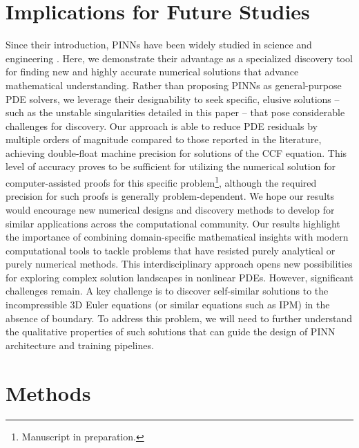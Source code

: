 \documentclass[fleqn,11pt]{wlscirep}
\begin{document}
\section*{Implications for Future Studies}

Since their introduction\cite{Raissi-Perdikaris-Karniadakis:pinn-first-paper}, PINNs have been widely studied in science and engineering \cite{Karniadakis-Kevrekidis-Lu-Perdikaris-Wang-Yang:pinn-nature-reviews}. Here, we demonstrate their advantage as a specialized discovery tool for finding new and highly accurate numerical solutions that advance mathematical understanding. Rather than proposing PINNs as general-purpose PDE solvers, we leverage their designability to seek specific, elusive solutions -- such as the unstable singularities detailed in this paper -- that pose considerable challenges for discovery. Our approach is able to reduce PDE residuals by multiple orders of magnitude compared to those reported in the literature, achieving double-float machine precision for solutions of the CCF equation. This level of accuracy proves to be sufficient for utilizing the numerical solution for computer-assisted proofs for this specific problem\footnote{Manuscript in preparation.}, although the required precision for such proofs is generally problem-dependent. We hope our results would encourage new numerical designs and discovery methods to develop for similar applications across the computational community. Our results highlight the importance of combining domain-specific mathematical insights with modern computational tools to tackle problems that have resisted purely analytical or purely numerical methods. This interdisciplinary approach opens new possibilities for exploring complex solution landscapes in nonlinear PDEs. However, significant challenges remain. A key challenge is to discover self-similar solutions to the incompressible 3D Euler equations (or similar equations such as IPM) in the absence of boundary. To address this problem, we will need to further understand the qualitative properties of such solutions that can guide the design of PINN architecture and training pipelines.




\newpage
\section*{Methods}
\label{methods}
\end{document}
